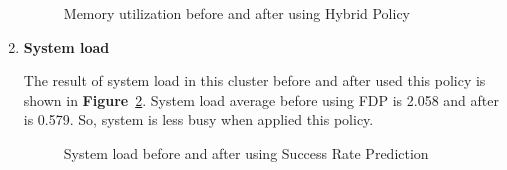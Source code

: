 \documentclass[12pt,oneside,openright,a4paper]{cpe-english-project}
\begin{document}
\begin{enumerate}
\begin{figure}[!h]\centering
    \setlength{\fboxrule}{0mm} %
    \setlength{\fboxsep}{0cm}
    \caption{Memory utilization before and after using Hybrid Policy}\label{fig:mem3}
\end{figure}

\newpage
  \item \textbf{System load}
  
\hspace{10mm}The result of system load in this cluster before and after used this policy is shown in \textbf{Figure}~\ref{fig:load3}. System load average before using FDP is 2.058 and after is 0.579. So, system is less busy when applied this policy.
  
\begin{figure}[!h]\centering
    \setlength{\fboxrule}{0mm} %
    \setlength{\fboxsep}{0cm}
    \caption{System load before and after using Success Rate Prediction}\label{fig:load3}
\end{figure}
\end{enumerate}
\end{document}
